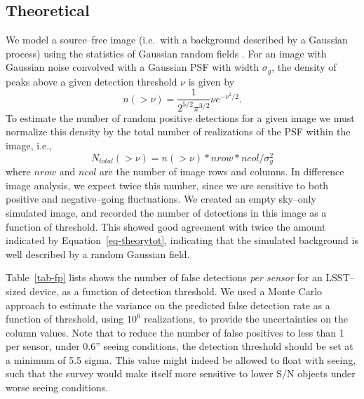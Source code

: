 \documentclass[floatfix, apj]{emulateapj}
\begin{document}
\subsection{Theoretical \label{sec-analyticfp}}

We model a source--free image (i.e.\ with a background described by a Gaussian process) using the statistics of Gaussian random fields \citep{Kaiser-PointSources}.
For an image with Gaussian noise convolved with a Gaussian PSF with width $\sigma_g$, the density of peaks above a given detection threshold $\nu$ is given by
\begin{equation}
n(>\nu) = \frac{1}{2^{5/2}\pi^{3/2}} \nu e^{-\nu^2 /2}.
\label{eq-theory}
\end{equation}
To estimate the number of random positive detections for a given image we must normalize this density by the total number of realizations of the PSF within the image, i.e.,
\begin{equation}
N_{total}(>\nu) = n(>\nu)*nrow*ncol/ \sigma_g^2
\label{eq-theorytot}
\end{equation}
where $nrow$ and $ncol$ are the number of image rows and columns.
In difference image analysis, we expect twice this number, since we are sensitive to both positive and negative--going fluctuations.
We created an empty sky--only simulated image, and recorded the number of detections in this image as a function of threshold.
This showed good agreement with twice the amount indicated by Equation~\ref{eq-theorytot}, indicating that the simulated background is well described by a random Gaussian field.

Table~\ref{tab-fp} lists shows the number of false detections {\it per sensor} for an LSST--sized device, as a function of detection threshold.
We used a Monte Carlo approach to estimate the variance on the predicted false detection rate as a function of threshold, using $10^6$ realizations, to provide the uncertainties on the column values.
Note that to reduce the number of false positives to less than 1 per sensor, under 0.6'' seeing conditions, the detection threshold should be set at a minimum of 5.5 sigma.
This value might indeed be allowed to float with seeing, such that the survey would make itself more sensitive to lower S/N objects under worse seeing conditions.
\end{document}
